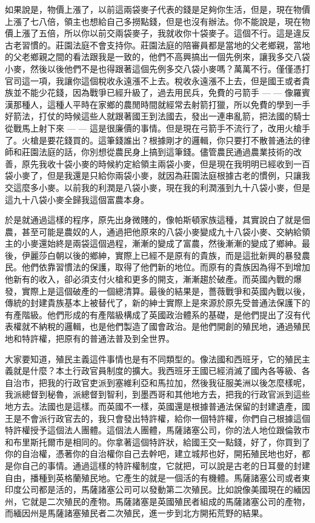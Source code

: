 如果說是，物價上漲了，以前這兩袋麥子代表的錢是足夠你生活，但是，現在物價上漲了七八倍，領主也想給自己多撈點錢，但是也沒有辦法。你不能說是，現在物價上漲了五倍，所以你以前交兩袋麥子，我就收你十袋麥子。這個不行。這是違反古老習慣的。莊園法庭不會支持你。莊園法庭的陪審員都是當地的父老鄉親，當地的父老鄉親之間的看法跟我是一致的，他們不高興搞出一個先例來，讓我多交八袋小麥，然後以後他們不是也得跟著這個先例多交八袋小麥嗎？萬萬不行。僅僅憑打官司這一項，我讓你這個稅收永遠漲不上去。稅收永遠漲不上去，但是國王或者貴族並不能少花錢，因為戰爭已經升級了，過去用民兵，免費的弓箭手 — — 像羅賓漢那種人，這種人平時在家鄉的農閒時間就經常去射箭打獵，所以免費的學到一手好箭法，打仗的時候這些人就跟著國王到法國去，發出一連串亂箭，把法國的騎士從戰馬上射下來 — — 這是很廉價的事情。但是現在弓箭手不流行了，改用火槍手了。火槍是要花錢買的。這筆錢誰出？根據剛才的邏輯，你只要打不散普通法的律師和莊園法庭的話，你別想從農民身上搞到這筆錢。儘管農民通過農業技術的改善，原先我收十袋小麥的時候約定給領主兩袋小麥，但是現在我明明已經收到一百袋小麥了，但是我還是只給你兩袋小麥，就因為莊園法庭根據古老的慣例，只讓我交這麼多小麥。以前我的利潤是八袋小麥，現在我的利潤漲到九十八袋小麥，但是這九十八袋小麥全歸我這個富農本身。

於是就通過這樣的程序，原先出身微賤的，像帕斯頓家族這種，其實說白了就是佃農，甚至可能是農奴的人，通過把他原來的八袋小麥變成九十八袋小麥、交納給領主的小麥還始終是兩袋這個過程，漸漸的變成了富農，然後漸漸的變成了鄉紳。最後，伊麗莎白朝以後的鄉紳，實際上已經不是原有的貴族，而是這批新興的暴發農民。他們依靠習慣法的保護，取得了他們新的地位。而原有的貴族因為得不到增加他新有的收入，卻必須支付火槍和更多的開支，漸漸趨於破產。而英國內戰的爆發，實際上是這個破產的一個總清算。最後的結果是，薔薇戰爭和英國內戰以後，傳統的封建貴族基本上被替代了，新的紳士實際上是來源於原先受普通法保護下的有產階級。他們形成的有產階級構成了英國政治體系的基礎，是他們提出了沒有代表權就不納稅的邏輯，也是他們製造了國會政治。是他們開創的殖民地，通過殖民地和特許權，把原有的普通法普及到全世界。

大家要知道，殖民主義這件事情也是有不同類型的。像法國和西班牙，它的殖民主義就是什麼？本土行政官員制度的擴大。我西班牙王國已經消滅了國內各等級、各自治市，把我的行政官吏派到塞維利亞和馬拉加，然後我征服美洲以後怎麼樣呢，我派總督到秘魯，派總督到智利，到墨西哥和其他地方去，把我的行政官派到這些地方去。法國也是這樣。而英國不一樣，英國還是根據普通法保留的封建遺產，國王是不會派行政官去的，我只會發出特許權，給你一個特許權，你們自己根據這個特許權授予這個法人團體。這個法人團體，馬薩諸塞公司，你的法人地位跟倫敦市和布里斯托爾市是相同的。你拿著這個特許狀，給國王交一點錢，好了，你買到了你的自治權，憑著你的自治權你自己去幹吧，建立城邦也好，開拓殖民地也好，都是你自己的事情。通過這樣的特許權制度，它就把，可以說是古老的日耳曼的封建自由，播種到英格蘭殖民地。它產生的就是一個活的有機體。馬薩諸塞公司或者東印度公司都是活的，馬薩諸塞公司可以發動第二次殖民。比如說像美國現在的緬因州，它就是二次殖民的產物。馬薩諸塞是英國殖民者組成的馬薩諸塞公司的產物，而緬因州是馬薩諸塞殖民者二次殖民，進一步到北方開拓荒野的結果。

